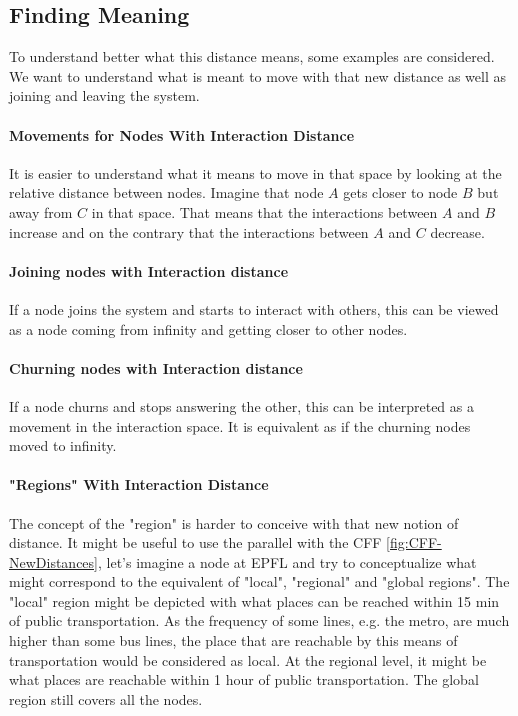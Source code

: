 \documentclass[a4paper,11pt,twoside,openright]{report}
\begin{document}
\subsection{Finding Meaning}
To understand better what this distance means, some examples are
considered. We want to understand what is meant to move with that new distance as
well as joining and leaving the system. 

\paragraph{Movements for Nodes With Interaction Distance}
It is easier to understand what it means to move in that space by looking at
the relative distance between nodes. Imagine that node $A$ gets closer to node
$B$ but away from $C$ in that space. That means that the interactions between
$A$ and $B$ increase and on the contrary that the interactions between $A$ and
$C$ decrease.

\paragraph{Joining nodes with Interaction distance}
If a node joins the system and starts to interact with others, this can be
viewed as a node coming from infinity and getting closer to other
nodes.

\paragraph{Churning nodes with Interaction distance}
If a node churns and stops answering the other, this can be interpreted as a
movement in the interaction space. It is equivalent as if the churning nodes moved
to infinity.  

\paragraph{"Regions" With Interaction Distance} \label{par:section-example}
The concept of the "region" is harder to conceive with that new notion of
distance. It might be useful to use the parallel with the CFF
\autoref{fig:CFF-NewDistances}, let's imagine a node at EPFL and try to
conceptualize what might correspond to the equivalent of "local", "regional" and "global regions". The "local" region might be depicted with what places can
be reached within 15 min of public transportation. As the frequency of some lines, e.g. the metro, are much higher than some bus lines, the place that are reachable by this means of transportation would be considered as local. At the regional level, it might be what
places are reachable within 1 hour of public transportation. The global region still
covers all the nodes.
\end{document}
